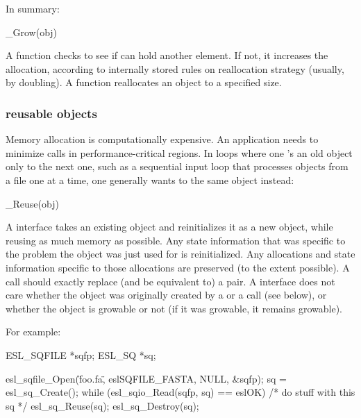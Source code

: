 In summary: 

\begin{sreapi}
\hypertarget{ifc:Grow}
{\item[\_Grow(obj)]}

A  function checks to see if  can hold
another element. If not, it increases the allocation, according to
internally stored rules on reallocation strategy (usually, by
doubling). A  function reallocates an object to a
specified size.
\end{sreapi}

  \subsubsection{reusable objects}

Memory allocation is computationally expensive. An application needs
to minimize  calls in performance-critical
regions. In loops where one 's an old object only
to  the next one, such as a sequential input loop
that processes objects from a file one at a time, one generally wants
to  the same object instead:

\begin{sreapi}
\hypertarget{ifc:Reuse}
{\item[\_Reuse(obj)]}

A  interface takes an existing object and
reinitializes it as a new object, while reusing as much memory as
possible. Any state information that was specific to the problem the
object was just used for is reinitialized. Any allocations and state
information specific to those allocations are preserved (to the extent
possible).  A  call should exactly replace (and be
equivalent to) a  pair. A
 interface does not care whether the object was
originally created by a  or a 
call (see below), or whether the object is growable or not (if it was
growable, it remains growable).
\end{sreapi}

For example:

\begin{cchunk}
   ESL_SQFILE *sqfp;
   ESL_SQ     *sq;

   esl_sqfile_Open(\"foo.fa\", eslSQFILE_FASTA, NULL, &sqfp);
   sq = esl_sq_Create();
   while (esl_sqio_Read(sqfp, sq) == eslOK)
    {
       /* do stuff with this sq */
       esl_sq_Reuse(sq);
    }
   esl_sq_Destroy(sq);
\end{cchunk}

